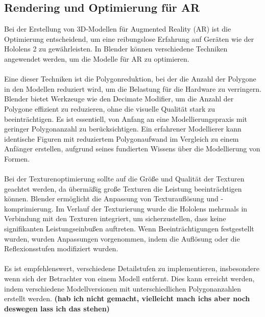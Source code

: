 \subsection{Rendering und Optimierung für AR}
Bei der Erstellung von 3D-Modellen für Augmented Reality (AR) ist die Optimierung entscheidend, um eine reibungslose
Erfahrung auf Geräten wie der Hololens 2 zu gewährleisten. In Blender können verschiedene Techniken angewendet werden,
um die Modelle für AR zu optimieren.\\
\\
Eine dieser Techniken ist die Polygonreduktion, bei der die Anzahl der Polygone in den Modellen reduziert wird, um die
Belastung für die Hardware zu verringern. Blender bietet Werkzeuge wie den Decimate Modifier, um die Anzahl der Polygone
effizient zu reduzieren, ohne die visuelle Qualität stark zu beeinträchtigen. Es ist essentiell, von Anfang an eine
Modellierungspraxis mit geringer Polygonanzahl zu berücksichtigen. Ein erfahrener Modellierer kann identische Figuren
mit reduziertem Polygonaufwand im Vergleich zu einem Anfänger erstellen, aufgrund seines fundierten Wissens über die
Modellierung von Formen.\\
\\
Bei der Texturenoptimierung sollte auf die Größe und Qualität der Texturen geachtet werden, da übermäßig große Texturen
die Leistung beeinträchtigen können. Blender ermöglicht die Anpassung von Texturauflösung und -komprimierung. Im Verlauf
der Texturierung wurde die Hololens mehrmals in Verbindung mit den Texturen integriert, um sicherzustellen, dass keine
signifikanten Leistungseinbußen auftreten. Wenn Beeinträchtigungen festgestellt wurden, wurden Anpassungen vorgenommen,
indem die Auflösung oder die Reflexionsstufen modifiziert wurden.\\
\\
Es ist empfehlenswert, verschiedene Detailstufen zu implementieren, insbesondere wenn sich der Betrachter von einem
Modell entfernt. Dies kann erreicht werden, indem verschiedene Modellversionen mit unterschiedlichen Polygonanzahlen
erstellt werden. \textbf{(hab ich nicht gemacht, vielleicht mach ichs aber noch deswegen lass ich das stehen)}

